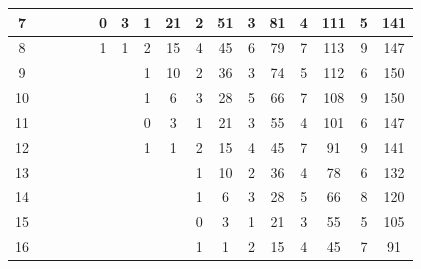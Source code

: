\documentclass{article}
\numberwithin{equation}{section}
\begin{document}
\begin{table}[htb!]
{\begin{tabular}{|c|cc|cc|cc|cc|cc|cc|cc|cc|}
7 & \multicolumn{1}{c|}{} &  & \multicolumn{1}{c|}{} &  & \multicolumn{1}{c|}{0} & 3 & \multicolumn{1}{c|}{1} & 21 & \multicolumn{1}{c|}{2} & 51 & \multicolumn{1}{c|}{3} & 81 & \multicolumn{1}{c|}{4} & 111 & \multicolumn{1}{c|}{5} & 141 \\ \hline
8 & \multicolumn{1}{c|}{} &  & \multicolumn{1}{c|}{} &  & \multicolumn{1}{c|}{1} & 1 & \multicolumn{1}{c|}{2} & 15 & \multicolumn{1}{c|}{4} & 45 & \multicolumn{1}{c|}{6} & 79 & \multicolumn{1}{c|}{7} & 113 & \multicolumn{1}{c|}{9} & 147 \\ \hline
9 & \multicolumn{1}{c|}{} &  & \multicolumn{1}{c|}{} &  & \multicolumn{1}{c|}{} &  & \multicolumn{1}{c|}{1} & 10 & \multicolumn{1}{c|}{2} & 36 & \multicolumn{1}{c|}{3} & 74 & \multicolumn{1}{c|}{5} & 112 & \multicolumn{1}{c|}{6} & 150 \\ \hline
10 & \multicolumn{1}{c|}{} &  & \multicolumn{1}{c|}{} &  & \multicolumn{1}{c|}{} &  & \multicolumn{1}{c|}{1} & 6 & \multicolumn{1}{c|}{3} & 28 & \multicolumn{1}{c|}{5} & 66 & \multicolumn{1}{c|}{7} & 108 & \multicolumn{1}{c|}{9} & 150 \\ \hline
11 & \multicolumn{1}{c|}{} &  & \multicolumn{1}{c|}{} &  & \multicolumn{1}{c|}{} &  & \multicolumn{1}{c|}{0} & 3 & \multicolumn{1}{c|}{1} & 21 & \multicolumn{1}{c|}{3} & 55 & \multicolumn{1}{c|}{4} & 101 & \multicolumn{1}{c|}{6} & 147 \\ \hline
12 & \multicolumn{1}{c|}{} &  & \multicolumn{1}{c|}{} &  & \multicolumn{1}{c|}{} &  & \multicolumn{1}{c|}{1} & 1 & \multicolumn{1}{c|}{2} & 15 & \multicolumn{1}{c|}{4} & 45 & \multicolumn{1}{c|}{7} & 91 & \multicolumn{1}{c|}{9} & 141 \\ \hline
13 & \multicolumn{1}{c|}{} &  & \multicolumn{1}{c|}{} &  & \multicolumn{1}{c|}{} &  & \multicolumn{1}{c|}{} &  & \multicolumn{1}{c|}{1} & 10 & \multicolumn{1}{c|}{2} & 36 & \multicolumn{1}{c|}{4} & 78 & \multicolumn{1}{c|}{6} & 132 \\ \hline
14 & \multicolumn{1}{c|}{} &  & \multicolumn{1}{c|}{} &  & \multicolumn{1}{c|}{} &  & \multicolumn{1}{c|}{} &  & \multicolumn{1}{c|}{1} & 6 & \multicolumn{1}{c|}{3} & 28 & \multicolumn{1}{c|}{5} & 66 & \multicolumn{1}{c|}{8} & 120 \\ \hline
15 & \multicolumn{1}{c|}{} &  & \multicolumn{1}{c|}{} &  & \multicolumn{1}{c|}{} &  & \multicolumn{1}{c|}{} &  & \multicolumn{1}{c|}{0} & 3 & \multicolumn{1}{c|}{1} & 21 & \multicolumn{1}{c|}{3} & 55 & \multicolumn{1}{c|}{5} & 105 \\ \hline
16 & \multicolumn{1}{c|}{} &  & \multicolumn{1}{c|}{} &  & \multicolumn{1}{c|}{} &  & \multicolumn{1}{c|}{} &  & \multicolumn{1}{c|}{1} & 1 & \multicolumn{1}{c|}{2} & 15 & \multicolumn{1}{c|}{4} & 45 & \multicolumn{1}{c|}{7} & 91 \\ \hline

\end{tabular}}
\end{table}
\end{document}
